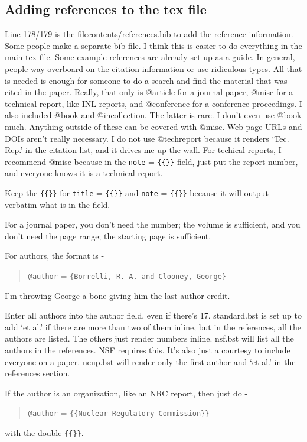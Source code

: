 \documentclass[11pt,a4paper]{article}
\begin{document}
\subsection*{Adding references to the tex file}
Line 178/179 is the filecontents/references.bib to add the reference information. Some people make a separate bib file. I think this is easier to do everything in the main tex file. Some example references are already set up as a guide. In general, people way overboard on the citation information or use ridiculous types. All that is needed is enough for someone to do a search and find the material that was cited in the paper. Really, that only is @article for a journal paper, @misc for a technical report, like INL reports, and @conference for a conference proceedings. I also included @book and @incollection. The latter is rare. I don't even use @book much. Anything outside of these can be covered with @misc. Web page URLs and DOIs aren't really necessary. I do not use @techreport because it renders `Tec. Rep.' in the citation list, and it drives me up the wall. For techical reports, I recommend @misc because in the \verb=note= = \verb={{}}= field, just put the report number, and everyone knows it is a technical report. 

Keep the \verb={{}}= for \verb=title= = \verb={{}}= and \verb=note= = \verb={{}}= because it will output verbatim what is in the field. 

For a journal paper, you don't need the number; the volume is sufficient, and you don't need the page range; the starting page is sufficient. 

For authors, the format is - 
\begin{quote}
    \verb=@author= = \verb={Borrelli, R. A. and Clooney, George}=
\end{quote}

I'm throwing George a bone giving him the last author credit. 

Enter all authors into the author field, even if there's 17. standard.bst is set up to add `et al.' if there are more than two of them inline, but in the references, all the authors are listed. The others just render numbers inline. nsf.bst will list all the authors in the references. NSF requires this. It's also just a courtesy to include everyone on a paper. neup.bst will render only the first author and `et al.' in the references section.

If the author is an organization, like an NRC report, then just do  - 
\begin{quote}
    \verb=@author= = \verb={{Nuclear Regulatory Commission}}= 
\end{quote}
with the double \verb={{}}=.
\end{document}
